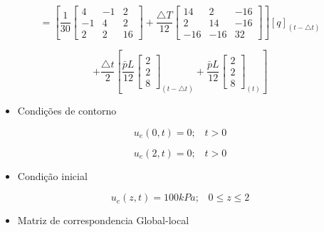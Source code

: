 \documentclass{article} %
\begin{document}
\begin{equation*}
[Q]=\left[\frac{1}{30}\begin{bmatrix}
4&-1&2\\
-1&4&2\\
2&2&16
\end{bmatrix}+\frac{\triangle T}{12}\begin{bmatrix}
14 &2&-16 \\
2&14&-16\\
-16&-16&32
\end{bmatrix}\right][q]_{(t-\triangle t)}
\end{equation*}


\begin{equation}
+\frac{\triangle t}{2}\left[\frac{\bar{p}L}{12}\begin{bmatrix}
2\\2\\8
\end{bmatrix}_{(t-\triangle t)}+\frac{\bar{p}L}{12}\begin{bmatrix}
2\\2\\8
\end{bmatrix}_{(t)}\right]
\end{equation}






\begin{itemize}
	\item Condições de contorno
\end{itemize}


\begin{equation}
u_e(0,t)=0;\hspace{10pt}t>0
\end{equation}

\begin{equation}
u_e(2,t)=0;\hspace{10pt}t>0
\end{equation}


\begin{itemize}
	\item Condição inicial
\end{itemize}


\begin{equation}
u_e(z,t)=100kPa;\hspace{10pt}0\leq z\leq2
\end{equation}


\begin{itemize}
	\item Matriz de correspondencia Global-local
\end{itemize}
\end{document}
